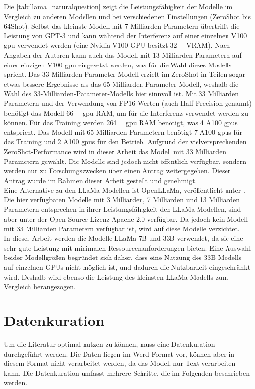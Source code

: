 Die \cref{tab:llama_naturalquestion} zeigt die Leistungsfähigkeit der Modelle im Vergleich zu anderen Modellen und bei verschiedenen Einstellungen (ZeroShot bis 64Shot).
Selbst das kleinste Modell mit 7 Milliarden Parametern übertrifft die Leistung von GPT-3 und kann während der Interferenz auf einer einzelnen V100 \ac{gpu} verwendet werden (eine Nvidia V100 \ac{GPU} besitzt \SI{32}{\giga\byte} VRAM).
Nach Angaben der Autoren kann auch das Modell mit 13 Milliarden Parametern auf einer einzigen V100 \ac{gpu} eingesetzt werden, was für die Wahl dieses Modells spricht.
Das 33-Milliarden-Parameter-Modell erzielt im ZeroShot in Teilen sogar etwas bessere Ergebnisse als das 65-Milliarden-Parameter-Modell, weshalb die Wahl des 33-Milliarden-Parameter-Modells hier sinnvoll ist.
Mit 33 Milliarden Parametern und der Verwendung von FP16 Werten (auch Half-Precision genannt) benötigt das Modell \SI{66}{\giga\byte} \ac{gpu} RAM, um für die Interferenz verwendet werden zu können.
Für das Training werden \SI{264}{\giga\byte} \ac{gpu} RAM benötigt, was 4 A100 \ac{gpu}s entspricht.
Das Modell mit 65 Milliarden Parametern benötigt 7 A100 \ac{gpu}s für das Training und 2 A100 \ac{gpu}s für den Betrieb.
Aufgrund der vielversprechenden ZeroShot-Performance wird in dieser Arbeit das Modell mit 33 Milliarden Parametern gewählt.
Die Modelle sind jedoch nicht öffentlich verfügbar, sondern werden nur zu Forschungszwecken über einen Antrag weitergegeben.
Dieser Antrag wurde im Rahmen dieser Arbeit gestellt und genehmigt.\\

Eine Alternative zu den LLaMa-Modellen ist OpenLLaMa, veröffentlicht unter \citet{openllama}.
Die hier verfügbaren Modelle mit 3 Milliarden, 7 Milliarden und 13 Milliarden Parametern entsprechen in ihrer Leistungsfähigkeit den LLaMa-Modellen, sind aber unter der Open-Source-Lizenz Apache 2.0 verfügbar.
Da jedoch kein Modell mit 33 Milliarden Parametern verfügbar ist, wird auf diese Modelle verzichtet.\\

In dieser Arbeit werden die Modelle LLaMa 7B und 33B verwendet, da sie eine sehr gute Leistung mit minimalen Ressourcenanforderungen bieten. Eine Auswahl beider Modellgrößen begründet sich daher, dass eine Nutzung des 33B Modells auf einzelnen GPUs nicht möglich ist, und dadurch die Nutzbarkeit eingeschränkt wird. Deshalb wird ebenso die Leistung des kleinsten LLaMa Modells zum Vergleich herangezogen.\\

\section{Datenkuration}
Um die Literatur optimal nutzen zu können, muss eine Datenkuration durchgeführt werden.
Die Daten liegen im Word-Format vor, können aber in diesem Format nicht verarbeitet werden, da das Modell nur Text verarbeiten kann.
Die Datenkuration umfasst mehrere Schritte, die im Folgenden beschrieben werden.\\

